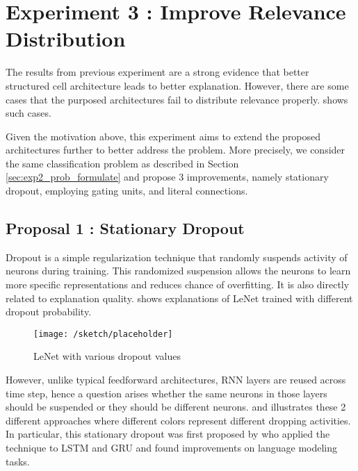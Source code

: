 \section{Experiment 3 : Improve Relevance Distribution}
The results from previous experiment are a strong evidence that better structured cell architecture leads to better explanation. However, there are some cases that the purposed architectures fail to distribute relevance properly.  \addfigure{\ref{fig:rel_failed_cases}} shows such cases. 


Given the motivation above, this experiment aims to extend the proposed architectures further to better address the problem. More precisely, we consider the same classification problem as described in Section \ref{sec:exp2_prob_formulate} and propose 3 improvements, namely stationary dropout, employing gating units,  and literal connections.

\subsection{Proposal 1 :  Stationary Dropout}
Dropout is a simple regularization technique that randomly suspends activity of neurons during training. This randomized suspension allows the neurons to learn more specific representations and reduces chance of overfitting.  It is also directly related to explanation quality. \addfigure{\ref{fig:lenet_various_dropout}} shows explanations of LeNet trained with different dropout probability.

\begin{figure}[!htb]
\centering
\texttt{[image: /sketch/placeholder]}
\caption{LeNet with various dropout values} 
\label{fig:lenet_various_dropout}  
\end{figure}

However, unlike typical feedforward architectures, RNN layers are reused across time step, hence a question arises whether the same neurons in those layers should be suspended or they should be different neurons. \addfigure{\ref{fig:lstm_naive_dropout}} and \addfigure{\ref{fig:lstm_variational_dropout}} illustrates these 2 different approaches where different colors represent different dropping activities. In particular, this stationary dropout was first proposed by \cite{GalTheoreticallyGroundedApplication2016} who applied  the technique to LSTM and GRU and found improvements on language modeling tasks.

\begin{figure}[!htb]
\centering
{} \\

\end{figure}

